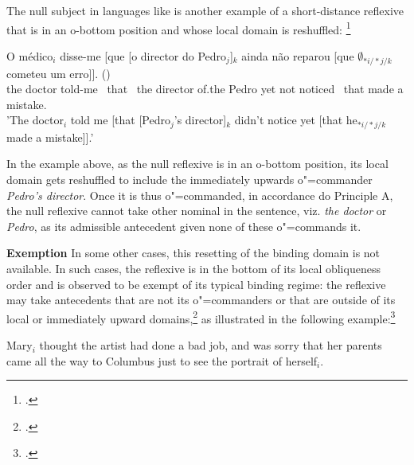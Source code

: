 \documentclass[output=paper
	        ,collection
	        ,collectionchapter
 	        ,biblatex
                ,babelshorthands
                ,newtxmath
                ,draftmode
                ,colorlinks, citecolor=brown
]{langscibook}
\begin{document}
The null subject in languages like  is another example of a short-distance 
reflexive that is in an o-bottom position and whose local domain is reshuffled:%
\footnote{
\citep{brancoNullSubject:2007}.
}

\begin{exe}
\ex
		\gll O m\'{e}dico$_{i}$ disse-me [que [o director do Pedro$_{j}$]$_{k}$ ainda n\~{a}o reparou [que $\emptyset_{*i/*j/k}$ cometeu um erro]]. ()\\
		the doctor told-me \mbox{ }that \mbox{ }the director of.the Pedro yet not noticed \mbox{ }that { } made a mistake.\\
		\trans 'The doctor$_{i}$ told me [that [Pedro$_{j}$'s director]$_{k}$ didn't notice yet [that he$_{*i/*j/k}$ made a mistake]].'

\end{exe}

In the example above, as the null reflexive is in an o-bottom position, its local domain gets reshuffled to include the immediately
upwards o"=commander {\em Pedro's director}. Once it is thus o"=commanded, in accordance do Principle A, the null reflexive cannot take other nominal in the sentence,
viz. {\em the doctor} or {\em Pedro}, as its admissible antecedent given none of these o"=commands it.

%


\textbf{Exemption} In some other cases, this resetting of the binding domain is not 
available. In such cases, the reflexive is in the bottom of its local obliqueness
order and is observed to be exempt of its typical binding regime: the reflexive may take antecedents 
that are not its o"=commanders or that are
outside of its local or immediately upward domains,\footnote{
\citep[]{polsag:hpsg94}.}
as illustrated in the following example:\footnote{
\citep[]{golde:diss99}.
}


\begin{exe}
\ex Mary$_{i}$ thought the artist had done a bad job, and was sorry
that her parents
came all the way to Columbus just to see the portrait of herself$_{i}$.
\end{exe}
\end{document}
